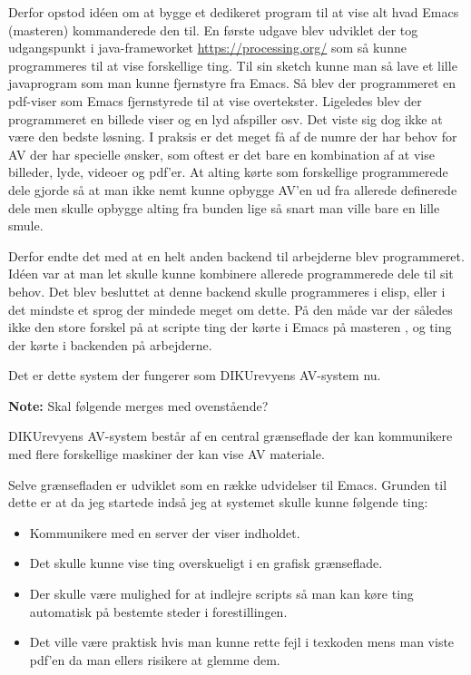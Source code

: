\documentclass[10pt,a4paper,danish]{article}
\newcommand{\note}[1]{\begin{mdframed}[style=note]\textbf{Note:}
    #1\end{mdframed}}
\begin{document}
{  Derfor opstod idéen om at bygge et dedikeret program til at vise alt hvad
  Emacs (masteren) kommanderede den til. En første udgave blev udviklet der tog
  udgangspunkt i java-frameworket \url{https://processing.org/} som så kunne
  programmeres til at vise forskellige ting. Til sin sketch kunne man så lave et
  lille javaprogram som man kunne fjernstyre fra Emacs.
  Så blev der programmeret en pdf-viser som Emacs fjernstyrede til at vise
  overtekster. Ligeledes blev der programmeret en billede viser og en lyd
  afspiller osv. Det viste sig dog ikke at være den bedste løsning. I praksis er
  det meget få af de numre der har behov for AV der har specielle ønsker, som
  oftest er det bare en kombination af at vise billeder, lyde, videoer og
  pdf'er. At alting kørte som forskellige programmerede dele gjorde så at man
  ikke nemt kunne opbygge AV'en ud fra allerede definerede dele men skulle
  opbygge alting fra bunden lige så snart man ville bare en lille smule.

  Derfor endte det med at en helt anden backend til arbejderne blev
  programmeret. Idéen var at man let skulle kunne kombinere allerede
  programmerede dele til sit behov. Det blev besluttet at denne backend skulle
  programmeres i elisp, eller i det mindste et sprog der mindede meget om dette.
  På den måde var der således ikke den store forskel på at scripte ting der
  kørte i Emacs på masteren , og ting der kørte i backenden på arbejderne.

  Det er dette system der fungerer som DIKUrevyens AV-system nu.
}
\note{Skal følgende merges med ovenstående?}
DIKUrevyens AV-system består af en central grænseflade der kan kommunikere med flere
forskellige maskiner der kan vise AV materiale.

Selve grænsefladen er udviklet som en række udvidelser til Emacs.
Grunden til dette er at da jeg startede indså jeg at systemet skulle kunne
følgende ting:
\begin{itemize}
\item Kommunikere med en server der viser indholdet.
\item Det skulle kunne vise ting overskueligt i en grafisk grænseflade.
\item Der skulle være mulighed for at indlejre scripts så man kan køre ting
  automatisk på bestemte steder i forestillingen.
\item Det ville være praktisk hvis man kunne rette fejl i texkoden mens man
  viste pdf'en da man ellers risikere at glemme dem.
\end{itemize}
\end{document}
